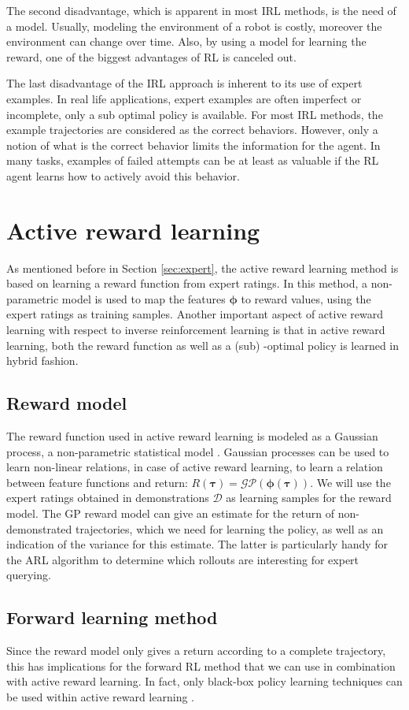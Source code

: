 \documentclass[mscThesis.tex]{subfiles}
\begin{document}
The second disadvantage, which is apparent in most IRL methods, is the need of a model. Usually, modeling the environment of a robot is costly, moreover the environment can change over time. Also, by using a model for learning the reward, one of the biggest advantages of RL is canceled out. 

The last disadvantage of the IRL approach is inherent to its use of expert examples. In real life applications, expert examples are often imperfect or incomplete, only a sub optimal policy is available. For most IRL methods, the example trajectories are considered as the correct behaviors. However, only a notion of what is the correct behavior limits the information for the agent. In many tasks, examples of failed attempts can be at least as valuable if the RL agent learns how to actively avoid this behavior. 

\section{Active reward learning}
\label{sec:arl}
As mentioned before in Section \ref{sec:expert}, the active reward learning method is based on learning a reward function from expert ratings. In this method, a non-parametric model is used to map the features $\bm{\phi}$ to reward values, using the expert ratings as training samples. Another important aspect of active reward learning with respect to inverse reinforcement learning is that in active reward learning, both the reward function as well as a (sub) -optimal policy is learned in hybrid fashion.

\subsection{Reward model}
The reward function used in active reward learning is modeled as a Gaussian process, a non-parametric statistical model \cite{rasmussen2006book}. Gaussian processes can be used to learn non-linear relations, in case of active reward learning, to learn a relation between feature functions and return: $R( \bm{\tau} ) = \mathcal{GP}(\bm{\phi}(\bm{\tau}))$. We will use the expert ratings obtained in demonstrations $\mathcal{D}$ as learning samples for the reward model. The GP reward model can give an estimate for the return of non-demonstrated trajectories, which we need for learning the policy, as well as an indication of the variance for this estimate. The latter is particularly handy for the ARL algorithm to determine which rollouts are interesting for expert querying.

\subsection{Forward learning method}
Since the reward model only gives a return according to a complete trajectory, this has implications for the forward RL method that we can use in combination with active reward learning. In fact, only black-box policy learning techniques can be used within active reward learning \cite{Daniel2015}.      

%
%
\end{document}
